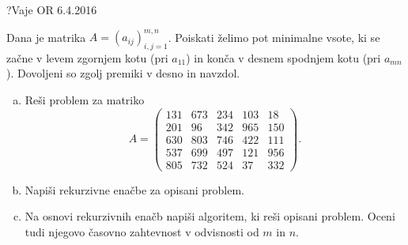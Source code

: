 \begin{naloga}{?}{Vaje OR 6.4.2016}
\begin{vprasanje}
Dana je matrika $A = (a_{ij})_{i,j=1}^{m,n}$.
Poiskati želimo pot minimalne vsote,
ki se začne v levem zgornjem kotu (pri $a_{11}$)
in konča v desnem spodnjem kotu (pri $a_{mn}$).
Dovoljeni so zgolj premiki v desno in navzdol.
\begin{enumerate}[(a)]
\item Reši problem za matriko
$$
A = \begin{pmatrix}
131 & 673 & 234 & 103 &  18 \\
201 &  96 & 342 & 965 & 150 \\
630 & 803 & 746 & 422 & 111 \\
537 & 699 & 497 & 121 & 956 \\
805 & 732 & 524 &  37 & 332
\end{pmatrix} .
$$
\item Napiši rekurzivne enačbe za opisani problem.
\item Na osnovi rekurzivnih enačb napiši algoritem, ki reši opisani problem.
Oceni tudi njegovo časovno zahtevnost v odvisnosti od $m$ in $n$.
\end{enumerate}

\end{vprasanje}
\begin{odgovor}
\end{odgovor}
\end{naloga}
